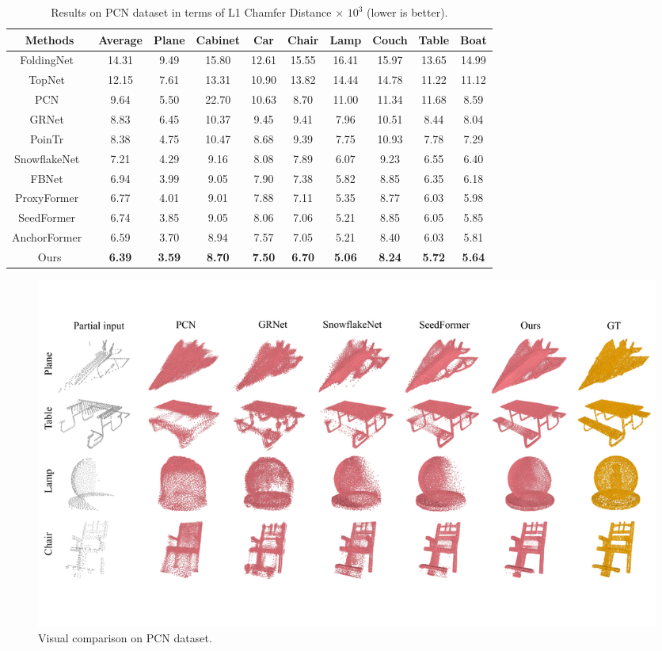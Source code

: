 \documentclass[letterpaper]{article} %
\begin{document}
\begin{table} [t]
\begin{center}
\begin{tabular}{c |  c | cccc cccc}
\toprule
Methods & Average & Plane &Cabinet& Car& Chair& Lamp &Couch &Table  &Boat\\
\midrule
FoldingNet~\cite{yang2018foldingnet}	&14.31	&9.49	&15.80	&12.61	&15.55	&16.41	&15.97	&13.65	&14.99\\
TopNet~\cite{tchapmi2019topnet}		&12.15	&7.61	&13.31	&10.90	&13.82	&14.44	&14.78	&11.22	&11.12\\
PCN~\cite{yuan2018pcn}		&9.64	&5.50	&22.70	&10.63	&8.70	&11.00	&11.34	&11.68	&8.59\\
GRNet~\cite{xie2020grnet}	&8.83	&6.45	&10.37	&9.45	&9.41	&7.96	&10.51	&8.44	&8.04\\
PoinTr~\cite{yu2021pointr}		&8.38	&4.75	&10.47	&8.68	&9.39	&7.75	&10.93	&7.78	&7.29\\
SnowflakeNet~\cite{xiang2021snowflakenet}&7.21	&4.29	&9.16	&8.08	&7.89	&6.07	&9.23	&6.55	&6.40\\
FBNet~\cite{yan2022fbnet}&6.94	&3.99	&9.05	&7.90	&7.38	&5.82	&8.85	&6.35	&6.18\\
ProxyFormer~\cite{li2023proxyformer} & 6.77 & 4.01& 9.01& 7.88& 7.11& 5.35& 8.77& 6.03& 5.98\\ 
SeedFormer~\cite{zhou2022seedformer} &6.74	&3.85	&9.05	&8.06	&7.06	&5.21	&8.85	&6.05	&5.85\\
AnchorFormer~\cite{chen2023anchorformer} & 6.59 & 3.70 &8.94& 7.57 &7.05 &5.21& 8.40 &6.03 &5.81\\
\midrule
Ours &\bf6.39	&\bf3.59	&\bf8.70	&\bf7.50	&\bf6.70	&\bf5.06	&\bf8.24	&\bf5.72	&\bf5.64\\
\bottomrule
\end{tabular}
\end{center}
\caption{Results on PCN dataset in terms of L1 Chamfer Distance $\times$ $10^3$ (lower is better). } \label{tab:pcn1}
\end{table}

\begin{figure}[!t]
\begin{center}
\includegraphics[width=1.0\linewidth]{Figures/vis_1.pdf}
\end{center}
   \caption{Visual comparison on PCN dataset.}
\label{fig:pcn}
\end{figure}
\end{document}

